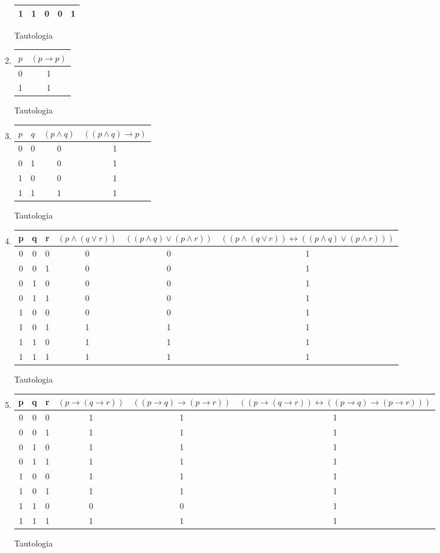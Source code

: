 \documentclass[a4paper]{article}
\begin{document}
\begin{enumerate}[label=\alph*)]
\begin{tabular}{|c|c|c|c|c|}
\hline 
1 & 1 & 0 & 0 & 1 \\ 
\hline 
\end{tabular} 
Tautologia
\item
\begin{tabular}{|c|c|}
\hline 
$p$ & $(p\rightarrow p)$ \\ 
\hline 
0 & 1 \\ 
\hline 
1 & 1 \\ 
\hline 
\end{tabular} 
Tautologia
\item
\begin{tabular}{|c|c|c|c|}
\hline 
$p$ & $q$ & $(p\wedge q)$ & $((p\wedge q)\rightarrow p)$ \\ 
\hline 
0 & 0 & 0 & 1 \\ 
\hline 
0 & 1 & 0 & 1 \\ 
\hline 
1 & 0 & 0 & 1 \\ 
\hline 
1 & 1 & 1 & 1 \\ 
\hline 
\end{tabular} 
Tautologia
\item
\begin{tabular}{|c|c|c|c|c|c|}
\hline 
p & q & r & $(p\wedge (q\vee r))$ & $((p\wedge q)\vee (p\wedge r))$ & $((p\wedge (q\vee r))\leftrightarrow ((p\wedge q)\vee (p\wedge r)))$ \\ 
\hline 
0 & 0 & 0 & 0 & 0 & 1 \\ 
\hline 
0 & 0 & 1 & 0 & 0 & 1 \\ 
\hline 
0 & 1 & 0 & 0 & 0 & 1 \\ 
\hline 
0 & 1 & 1 & 0 & 0 & 1 \\ 
\hline 
1 & 0 & 0 & 0 & 0 & 1 \\ 
\hline 
1 & 0 & 1 & 1 & 1 & 1 \\ 
\hline 
1 & 1 & 0 & 1 & 1 & 1 \\ 
\hline 
1 & 1 & 1 & 1 & 1 & 1 \\  
\hline 
\end{tabular} 
Tautologia
\item
\begin{tabular}{|c|c|c|c|c|c|}
\hline 
p & q & r & $(p\rightarrow (q\rightarrow r))$ & $((p\rightarrow q)\rightarrow (p\rightarrow r))$ & $((p\rightarrow (q\rightarrow r))\leftrightarrow ((p\rightarrow q)\rightarrow (p\rightarrow r)))$ \\ 
\hline 
0 & 0 & 0 & 1 & 1 & 1 \\ 
\hline 
0 & 0 & 1 & 1 & 1 & 1 \\ 
\hline 
0 & 1 & 0 & 1 & 1 & 1 \\ 
\hline 
0 & 1 & 1 & 1 & 1 & 1 \\ 
\hline 
1 & 0 & 0 & 1 & 1 & 1 \\ 
\hline 
1 & 0 & 1 & 1 & 1 & 1 \\ 
\hline 
1 & 1 & 0 & 0 & 0 & 1 \\ 
\hline 
1 & 1 & 1 & 1 & 1 & 1 \\ 
\hline 
\end{tabular} 
Tautologia
\end{enumerate}
\end{document}
